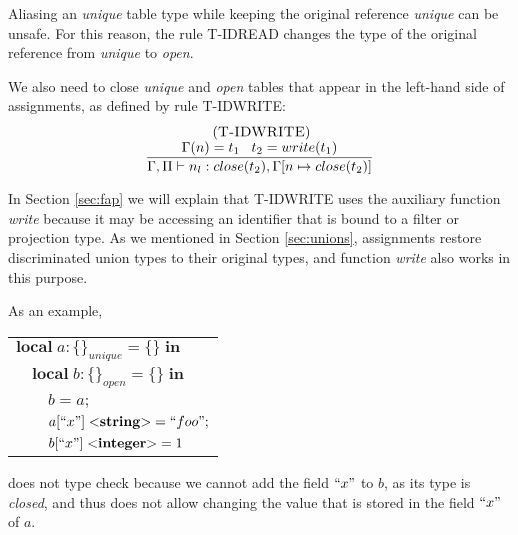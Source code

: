 Aliasing an \emph{unique} table type while keeping the original
reference \emph{unique} can be unsafe.
For this reason, the rule \textsc{T-IDREAD} changes the type of
the original reference from \emph{unique} to \emph{open}.

We also need to close \emph{unique} and \emph{open} tables that
appear in the left-hand side of assignments, as defined by
rule \textsc{T-IDWRITE}:
\[
\begin{array}{c}
\; (\textsc{T-IDWRITE})\\
\dfrac{\Gamma(n) = t_{1} \;\;\; t_{2} = write(t_{1})}
      {\Gamma, \Pi \vdash n_{l}:close(t_{2}), \Gamma[n \mapsto close(t_{2})]}
\end{array}
\]

In Section \ref{sec:fap} we will explain that \textsc{T-IDWRITE} uses
the auxiliary function \emph{write} because it may be accessing an
identifier that is bound to a filter or projection type.
As we mentioned in Section \ref{sec:unions}, assignments restore
discriminated union types to their original types, and
function \emph{write} also works in this purpose.

As an example,
\begin{center}
\begin{tabular}{lll}
\multicolumn{3}{l}{$\mathbf{local} \; a:\{\}_{unique} = \{\} \; \mathbf{in}$}\\
& \multicolumn{2}{l}{$\mathbf{local} \; b:\{\}_{open} = \{\} \; \mathbf{in}$}\\
& & \multicolumn{1}{l}{$b = a;$}\\
& & \multicolumn{1}{l}{$a[``x"] \; {<}\mathbf{string}{>} = ``foo";$}\\
& & \multicolumn{1}{l}{$b[``x"] \; {<}\mathbf{integer}{>} = 1$}\\
\end{tabular}
\end{center}
does not type check because we cannot add the field $``x"$ to $b$,
as its type is \emph{closed}, and thus does not allow changing the
value that is stored in the field $``x"$ of $a$.

